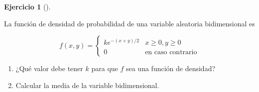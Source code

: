 \documentclass[
  spanish,
  a4paper,
]{scrreport}
\theoremstyle{definition}
\newtheorem{exercise}{Ejercicio}[chapter]
\theoremstyle{remark}
\begin{document}
\begin{exercise}[]\protect\hypertarget{exr-funcion-densidad-exponencial-exponencial}{}\label{exr-funcion-densidad-exponencial-exponencial}

La función de densidad de probabilidad de una variable aleatoria
bidimensional es

\[
f(x,y) = 
\begin{cases}
ke^{-(x+y)/2} & x\geq 0, y\geq 0\\
0 & \mbox{en caso contrario}
\end{cases}
\]

\begin{enumerate}
\def\labelenumi{\alph{enumi}.}
\item
  ¿Qué valor debe tener \(k\) para que \(f\) sea una función de
  densidad?
\item
  Calcular la media de la variable bidimensional.
\end{enumerate}

\end{exercise}
\end{document}
